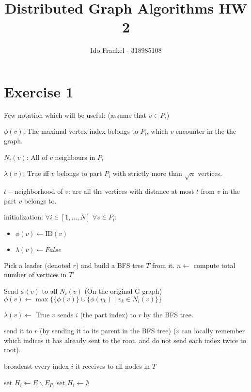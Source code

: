 \documentclass[11pt]{article}
\begin{document}
\author{Ido Frankel - 318985108}
\title{Distributed Graph Algorithms HW 2}
\maketitle

\medskip


\section{Exercise 1}
Few notation which will be useful: (assume that $v \in P_i$)

$\phi(v)$: The maximal vertex index belongs to $P_i$, which $v$ encounter in the the graph.

$N_i(v)$: All of $v$ neighbours in $P_i$

$\lambda(v)$: True iff $v$ belongs to part $P_i$ with strictly more than $\sqrt{n}$ vertices.

$t-$neighborhood of $v$: are all the vertices with distance at most $t$ from $v$ in the part $v$ belongs to.

\begin{algorithmic}[1]
\State initialization: $\forall i \in [1,\dots, N]$ $\forall v \in P_i$:
\begin{itemize}
    \item $\phi(v) \leftarrow \text{ID}(v)$
    \item $\lambda(v) \leftarrow False$
\end{itemize}

\State Pick a leader (denoted $r$) and build a BFS tree $T$ from it.
\State $n \leftarrow$ compute total number of vertices in $T$


\State Send $\phi(v)$ to all $N_i(v)$ (On the original G graph)
\State $\phi(v) \leftarrow \max \{ \{ \phi(v) \} \cup \{  { \phi(v_k) \mid v_k \in N_i(v)} \} \}$

    \State $\lambda(v) \leftarrow $ True
    \State $v$ sends $i$ (the part index) to $r$ by the BFS tree.
\EndIf
\EndFor


    \State send it to $r$ (by sending it to its parent in the BFS tree) ($v$ can locally remember which indices it has already sent to the root, and do not send each index twice to root).
\EndIf 

    \State broadcast every index $i$ it receives to all nodes in $T$
\EndIf 

    \State set $H_i  \leftarrow E \backslash E_{P_{i}}$
\Else
    \State set $H_i \leftarrow \emptyset$
\EndIf

\end{algorithmic}
\end{document}
